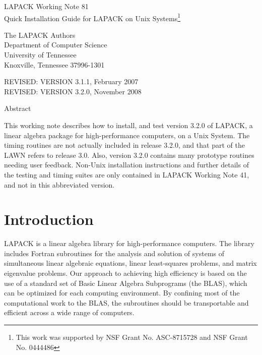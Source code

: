 \documentclass[11pt]{report}
\begin{document}
\begin{center}
  {\Large LAPACK Working Note 81\\
  Quick Installation Guide for LAPACK on Unix Systems\footnote{This work was
 supported by NSF Grant No. ASC-8715728  and NSF Grant No. 0444486}}
\end{center}
\begin{center}
  The LAPACK Authors\\
  Department of Computer Science \\
  University of Tennessee \\
  Knoxville, Tennessee  37996-1301 \\
\end{center}
\begin{center}
  REVISED:  VERSION 3.1.1, February 2007 \\
  REVISED:  VERSION 3.2.0, November 2008
\end{center}

\begin{center}
Abstract
\end{center}
This working note describes how to install, and test version 3.2.0
of LAPACK, a linear algebra package for high-performance
computers, on a Unix System.  The timing routines are not actually included in
release 3.2.0, and that part of the LAWN refers to release 3.0.  Also,
version 3.2.0 contains many prototype routines needing user feedback.
Non-Unix installation instructions and
further details of the testing and timing suites are only contained in
LAPACK Working Note 41, and not in this abbreviated version.
\newpage

\tableofcontents

\newpage

\section{Introduction}

LAPACK is a linear algebra library for high-performance
computers.
The library includes Fortran subroutines for 
the analysis and solution of systems of simultaneous linear algebraic
equations, linear least-squares problems, and matrix eigenvalue
problems.
Our approach to achieving high efficiency is based on the use of
a standard set of Basic Linear Algebra Subprograms (the BLAS),
which can be optimized for each computing environment.
By confining most of the computational work to the BLAS,
the subroutines should be 
transportable and efficient across a wide range of computers.
\end{document}
